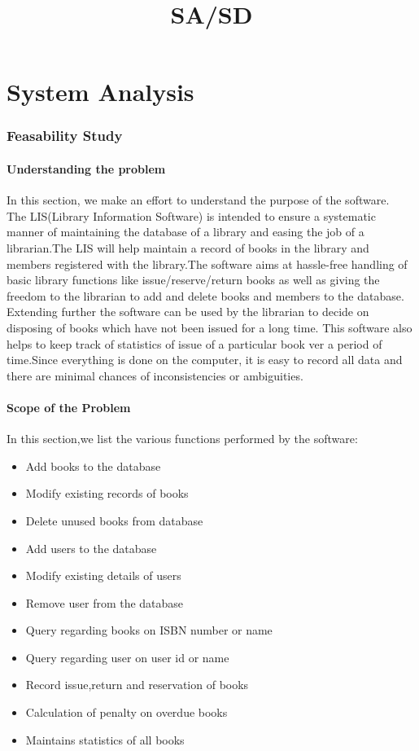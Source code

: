 \documentclass{article}
\title{SA/SD}
\begin{document}
\maketitle
\part{System Analysis}
\section{Feasability Study}
\subsection{Understanding the problem}
In this section, we make an effort to understand the purpose of the software.
\\
The LIS(Library Information Software) is intended to ensure a systematic manner of maintaining the database of a library and easing the job of a librarian.The LIS will help maintain a record of books in the library and members registered with the library.The software aims at hassle-free handling of basic library functions like issue/reserve/return books as well as giving the freedom to the librarian to add and delete books and members to the database.
	Extending further the software can be used by the librarian to decide on disposing of books which have not been issued for a long time. This software also helps to keep track of statistics of issue of a particular book ver a period of time.Since everything is done
on the computer, it is easy to record all data and there are minimal chances of
inconsistencies or ambiguities.
\subsection{Scope of the Problem}
In this section,we list the various functions performed by the software:
\begin{itemize}
\item Add books to the database
\item Modify existing records of books
\item Delete unused books from database
\item Add users to the database
\item Modify existing details of users
\item Remove user from the database
\item Query regarding books on ISBN number or name
\item Query regarding user on user id or name
\item Record issue,return and reservation of books
\item Calculation of penalty on overdue books
\item Maintains statistics of all books 
\end{itemize}
\end{document}
